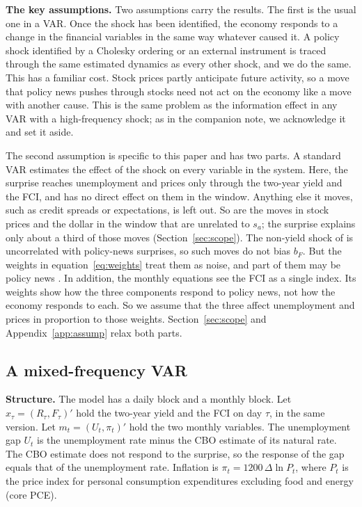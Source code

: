 \documentclass[11pt]{article}
\begin{document}
\textbf{The key assumptions.} Two assumptions carry the results. The first is the usual one in a VAR. Once the shock has been identified, the economy responds to a change in the financial variables in the same way whatever caused it. A policy shock identified by a Cholesky ordering or an external instrument is traced through the same estimated dynamics as every other shock, and we do the same. This has a familiar cost. Stock prices partly anticipate future activity, so a move that policy news pushes through stocks need not act on the economy like a move with another cause. This is the same problem as the information effect in any VAR with a high-frequency shock; as in the companion note, we acknowledge it and set it aside.

The second assumption is specific to this paper and has two parts. A standard VAR estimates the effect of the shock on every variable in the system. Here, the surprise reaches unemployment and prices only through the two-year yield and the FCI, and has no direct effect on them in the window. Anything else it moves, such as credit spreads or expectations, is left out. So are the moves in stock prices and the dollar in the window that are unrelated to $s_a$; the surprise explains only about a third of those moves (Section~\ref{sec:scope}). The non-yield shock of \citet{boehm2024} is uncorrelated with policy-news surprises, so such moves do not bias $b_F$. But the weights in equation~\eqref{eq:weights} treat them as noise, and part of them may be policy news \citep{boehm2024,bauer2026}. In addition, the monthly equations see the FCI as a single index. Its weights show how the three components respond to policy news, not how the economy responds to each. So we assume that the three affect unemployment and prices in proportion to those weights. Section~\ref{sec:scope} and Appendix~\ref{app:assump} relax both parts.

\subsection{A mixed-frequency VAR}\label{sec:midas}
\textbf{Structure.} The model has a daily block and a monthly block. Let $x_\tau=(R_\tau,F_\tau)'$ hold the two-year yield and the FCI on day $\tau$, in the same version. Let $m_t=(U_t,\pi_t)'$ hold the two monthly variables. The unemployment gap $U_t$ is the unemployment rate minus the CBO estimate of its natural rate. The CBO estimate does not respond to the surprise, so the response of the gap equals that of the unemployment rate. Inflation is $\pi_t=1200\,\Delta\ln P_t$, where $P_t$ is the price index for personal consumption expenditures excluding food and energy (core PCE).
\end{document}
